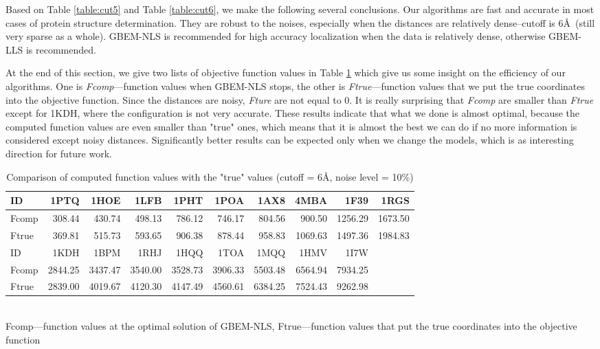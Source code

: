 \documentclass[a4paper,12pt]{article}
\begin{document}
Based on Table \ref{table:cut5} and Table \ref{table:cut6}, we make the following several conclusions. Our algorithms are fast and accurate in most cases of protein structure determination. They are robust to the noises, especially when the distances are relatively dense--cutoff is 6\AA ~(still very sparse as a whole). GBEM-NLS is recommended for high accuracy localization when the data is relatively dense, otherwise GBEM-LLS is recommended.

At the end of this section, we give two lists of objective function values in Table \ref{table:fval} which give us some insight on the efficiency of our algorithms. One is \emph{Fcomp}---function values when GBEM-NLS stops, the other is \emph{Ftrue}---function values that we put the true coordinates into the objective function. Since the distances are noisy, \emph{Fture} are not equal to 0. It is really surprising that \emph{Fcomp} are smaller than \emph{Ftrue} except for 1KDH, where the configuration is not very accurate. These results indicate that what we done is almost optimal, because the computed function values are even smaller than "true" ones, which means that it is almost the best we can do if no more information is considered except noisy distances. Significantly better results can be expected only when we change the models, which is as interesting direction for future work.

\setlength{\tabcolsep}{6pt}
\begin{table}[htb!]
\centering
\scriptsize{
\caption{Comparison of computed function values with the "true" values (cutoff = 6\AA, noise level = 10\%)}
\begin{tabular}{lrrrrrrrrr}
  \toprule
  ID    & 1PTQ & 1HOE & 1LFB & 1PHT & 1POA & 1AX8 & 4MBA & 1F39 & 1RGS \\
  \midrule
  Fcomp & 308.44 & 430.74 & 498.13 & 786.12 & 746.17 & 804.56 &  900.50	& 1256.29 & 1673.50 \\	
  Ftrue & 369.81 & 515.73 & 593.65 & 906.38	& 878.44 & 958.83 & 1069.63	& 1497.36 & 1984.83	\\
  \midrule
  \midrule
  ID & 1KDH & 1BPM & 1RHJ & 1HQQ & 1TOA & 1MQQ & 1HMV & 1I7W & \\
  \midrule
  Fcomp & 2844.25 &3437.47&	3540.00&	3528.73 & 3906.33 & 5503.48	& 6564.94 & 7934.25 & \\
  Ftrue & 2839.00 &4019.67&	4120.30&	4147.49 & 4560.61 &	6384.25 & 7524.43 &	9262.98 & \\
  \toprule
\end{tabular}\\[-4mm]
\label{table:fval}
\bl Fcomp---function values at the optimal solution of GBEM-NLS, Ftrue---function values that put the true coordinates into the objective function
\el
}
\end{table}
\end{document}
